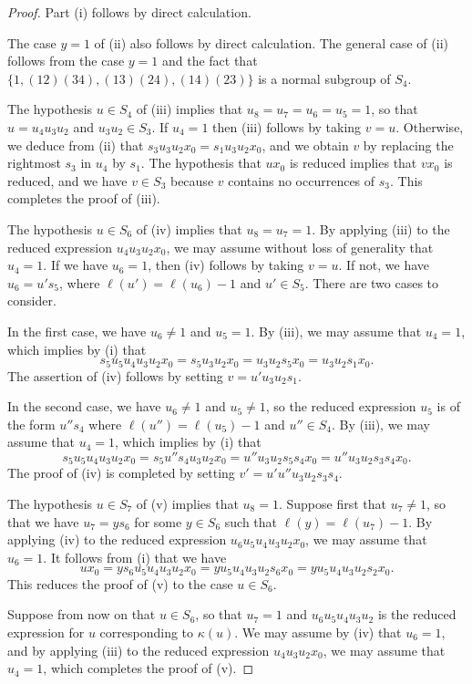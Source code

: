 \documentclass{amsart}
\theoremstyle{plain}
\theoremstyle{definition}
\theoremstyle{remark}
\numberwithin{equation}{section}
\newcommand{\leh}{\kappa}
\begin{document}
\begin{proof}
Part (i) follows by direct calculation. 

The case $y = 1$ of (ii) also follows by direct calculation. The general case of (ii) follows from the 
case $y = 1$ and the fact that $\{1, (12)(34), (13)(24), (14)(23)\}$ is a normal subgroup of $S_4$.

The hypothesis $u \in S_4$ of (iii) implies that $u_8=u_7=u_6=u_5=1$, so that $u = u_4 u_3 u_2$ and
$u_3 u_2 \in S_3$. If $u_4 = 1$ then (iii) follows by taking $v=u$. Otherwise, we deduce from (ii) that 
$s_3 u_3 u_2 x_0 = s_1 u_3 u_2 x_0$, and we obtain $v$ by replacing the rightmost $s_3$ in $u_4$ by
$s_1$. The hypothesis that $ux_0$ is reduced implies that $vx_0$ is reduced, and we have $v \in S_3$ because
$v$ contains no occurrences of $s_3$. This completes the proof of (iii).

The hypothesis $u \in S_6$ of (iv) implies that $u_8=u_7=1$. By applying (iii) to the reduced expression
$u_4 u_3 u_2 x_0$, we may assume without loss of generality that $u_4=1$. If we have $u_6=1$, then (iv) 
follows by taking $v=u$. If not, we have $u_6 = u' s_5$, where $\ell(u') = \ell(u_6)-1$ and $u' \in S_5$.
There are two cases to consider.

In the first case, we have $u_6 \ne 1$ and $u_5=1$. By (iii), we may assume that $u_4=1$, which implies 
by (i) that $$
s_5 u_5 u_4 u_3 u_2 x_0 = s_5 u_3 u_2 x_0 = u_3 u_2 s_5 x_0 =u_3 u_2 s_1 x_0
.$$ The assertion of (iv) follows by setting $v = u' u_3 u_2 s_1$.

In the second case, we have $u_6 \ne 1$ and $u_5 \ne 1$, so the reduced expression $u_5$ is of the form
$u'' s_4$ where $\ell(u'') = \ell(u_5)-1$ and $u'' \in S_4$. By (iii), we may assume that $u_4=1$, which 
implies by (i) that $$
s_5 u_5 u_4 u_3 u_2 x_0 = s_5 u'' s_4 u_3 u_2 x_0 = u'' u_3 u_2 s_5 s_4 x_0 = u'' u_3 u_2 s_3 s_4 x_0
.$$ The proof of (iv) is completed by setting $v' = u' u'' u_3 u_2 s_3 s_4$.

The hypothesis $u \in S_7$ of (v) implies that $u_8=1$. Suppose first that $u_7 \ne 1$, so that we have 
$u_7 = y s_6$ for some $y \in S_6$ such that $\ell(y) = \ell(u_7)-1$. By applying (iv) to the reduced 
expression $u_6 u_5 u_4 u_3 u_2 x_0$, we may assume that $u_6=1$. It follows from (i) that we have $$
u x_0 = y s_6 u_5 u_4 u_3 u_2 x_0 = y u_5 u_4 u_3 u_2 s_6 x_0 = y u_5 u_4 u_3 u_2 s_2 x_0
.$$ This reduces the proof of (v) to the case $u \in S_6$.

Suppose from now on that $u \in S_6$, so that $u_7=1$ and $u_6 u_5 u_4 u_3 u_2$ is the reduced expression 
for $u$ corresponding to $\leh(u)$. We may assume by (iv) that $u_6=1$, and by applying (iii) to the 
reduced expression $u_4 u_3 u_2 x_0$, we may assume that $u_4=1$, which completes the proof of (v).
\end{proof}
\end{document}
